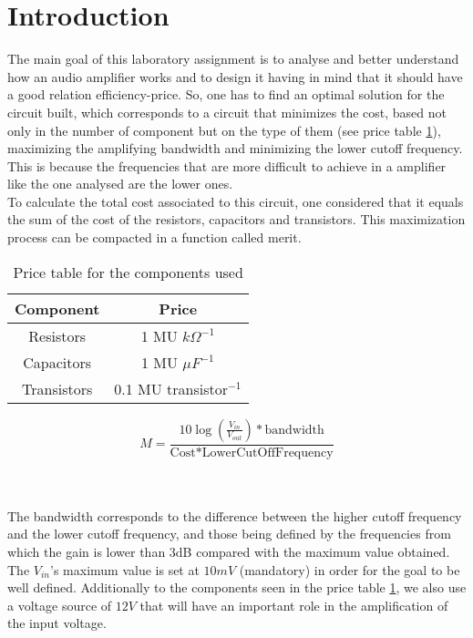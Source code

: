 \section{Introduction}
The main goal of this laboratory assignment is to analyse and better understand how an audio amplifier works and to design it having in mind that it should have a good relation efficiency-price. So, one has to find an optimal solution for the circuit built, which corresponds to a circuit that minimizes the cost, based not only in the number of component but on the type of them (see price table \ref{tab:price}), maximizing the amplifying bandwidth and minimizing the lower cutoff frequency. This is because the frequencies that are more difficult to achieve in a amplifier like the one analysed are the lower ones.\\

To calculate the total cost associated to this circuit, one considered that it equals the sum of the cost of the resistors, capacitors and transistors. This maximization process can be compacted in a function called merit.\\

\vspace{-2mm}
\begin{minipage}{.45\textwidth}
\begin{table}[H]
    \centering
    \begin{tabular}{c|c}
        \textbf{Component} &  \textbf{Price}\\
        \hline
        Resistors & 1 MU $k\Omega^{-1}$ \\
        Capacitors & 1 MU $\mu F^{-1}$ \\
        Transistors & 0.1 MU transistor$^{-1}$
    \end{tabular}
    \caption{Price table for the components used}
    \label{tab:price}
\end{table}
\end{minipage}
\begin{minipage}{.45\textwidth}
\begin{equation}
    M = \frac{10\log\left(\frac{V_{in}}{V_{out}}\right) * \text{bandwidth}}{\text{Cost}*\text{LowerCutOffFrequency}}
    \label{score}
\end{equation}
\end{minipage}\\\\

The bandwidth corresponds to the difference between the higher cutoff frequency and the lower cutoff frequency, and those being defined by the frequencies from which the gain is lower than 3dB compared with the maximum value obtained. The $V_{in}$'s maximum value is set at $10mV$ (mandatory) in order for the goal to be well defined. Additionally to the components seen in the price table \ref{tab:price}, we also use a voltage source of $12V$ that will have an important role in the amplification of the input voltage.\\

